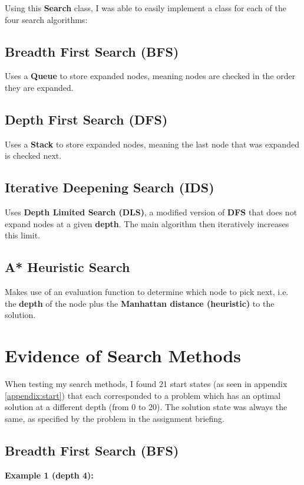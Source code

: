 \documentclass{article}
\begin{document}
	Using this \textbf{Search} class, I was able to easily implement a class for each of the four search algorithms:
	
	\subsection{Breadth First Search (BFS)}
	Uses a \textbf{Queue} to store expanded nodes, meaning nodes are checked in the order they are expanded.
	
	\subsection{Depth First Search (DFS)}
	Uses a \textbf{Stack} to store expanded nodes, meaning the last node that was expanded is checked next.
	
	\subsection{Iterative Deepening Search (IDS)}
	Uses \textbf{Depth Limited Search (DLS)}, a modified version of \textbf{DFS} that does not expand nodes at a given \textbf{depth}. The main algorithm then iteratively increases this limit. 
	
	\subsection{A* Heuristic Search}
	Makes use of an evaluation function to determine which node to pick next, i.e. the \textbf{depth} of the node plus the \textbf{Manhattan distance (heuristic)} to the solution.
	
	\section{Evidence of Search Methods}
	When testing my search methods, I found 21 start states (as seen in appendix \ref{appendix:start}) that each corresponded to a problem which has an optimal solution at a different depth (from 0 to 20). The solution state was always the same, as specified by the problem in the assignment briefing.
	
	\subsection{Breadth First Search (BFS)}
	\textbf{Example 1 (depth 4):}
	
\end{document}
